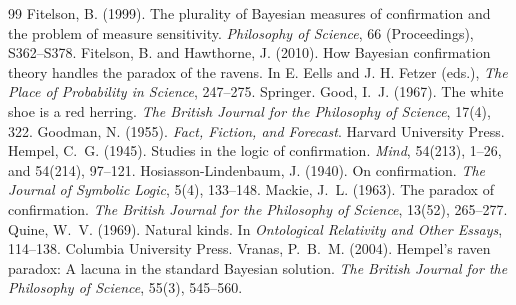 \documentclass{situationist-preprint}
\begin{document}
\begin{thebibliography}{99}\small
{} Fitelson, B. (1999). The plurality of Bayesian measures of confirmation and the problem of measure sensitivity. \emph{Philosophy of Science}, 66 (Proceedings), S362--S378.
 Fitelson, B. and Hawthorne, J. (2010). How Bayesian confirmation theory handles the paradox of the ravens. In E. Eells and J. H. Fetzer (eds.), \emph{The Place of Probability in Science}, 247--275. Springer.
 Good, I.~J. (1967). The white shoe is a red herring. \emph{The British Journal for the Philosophy of Science}, 17(4), 322.
 Goodman, N. (1955). \emph{Fact, Fiction, and Forecast}. Harvard University Press.
 Hempel, C.~G. (1945). Studies in the logic of confirmation. \emph{Mind}, 54(213), 1--26, and 54(214), 97--121.
 Hosiasson-Lindenbaum, J. (1940). On confirmation. \emph{The Journal of Symbolic Logic}, 5(4), 133--148.
 Mackie, J.~L. (1963). The paradox of confirmation. \emph{The British Journal for the Philosophy of Science}, 13(52), 265--277.
 Quine, W.~V. (1969). Natural kinds. In \emph{Ontological Relativity and Other Essays}, 114--138. Columbia University Press.
 Vranas, P.~B.~M. (2004). Hempel's raven paradox: A lacuna in the standard Bayesian solution. \emph{The British Journal for the Philosophy of Science}, 55(3), 545--560.
\end{thebibliography}
\end{document}
